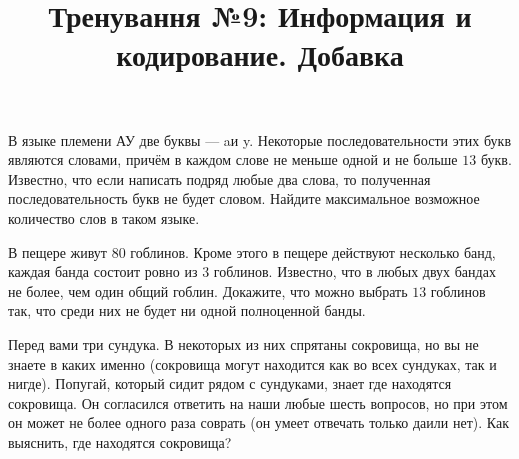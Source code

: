 


\title{Тренування №9: Информация и кодирование. Добавка}
\maketitle
\begin{problem}
	В языке племени АУ две буквы --- \guillemotleft a\guillemotright и \guillemotleft y\guillemotright. Некоторые последовательности этих букв являются словами, причём в каждом слове не меньше одной и не больше $13$ букв. Известно, что если написать подряд любые два слова, то полученная последовательность букв не будет словом. Найдите максимальное возможное количество слов в таком языке.
\end{problem}

\begin{problem}
	В пещере живут $80$ гоблинов. Кроме этого в пещере действуют несколько банд, каждая банда состоит ровно из $3$ гоблинов. Известно, что в любых двух бандах не более, чем один общий гоблин. Докажите, что можно выбрать $13$ гоблинов так, что среди них не будет ни одной полноценной банды.
\end{problem}

\begin{problem}
	Перед вами три сундука. В некоторых из них спрятаны сокровища, но вы не знаете в каких именно (сокровища могут находится как во всех сундуках, так и нигде). Попугай, который сидит рядом с сундуками, знает где находятся сокровища. Он согласился ответить на наши любые шесть вопросов, но при этом он может не более одного раза соврать (он умеет отвечать только \guillemotleft да\guillemotright или \guillemotleft нет\guillemotright). Как выяснить, где находятся сокровища?
\end{problem}

